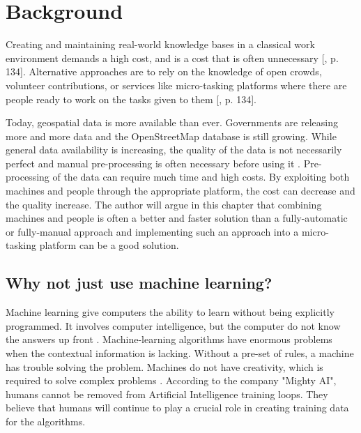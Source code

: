 \chapter{Background}\label{chp:background}

Creating and maintaining real-world knowledge bases in a classical work environment demands a high cost, and is a cost that is often unnecessary [\citep{Meier2013}, p. 134]. Alternative approaches are to rely on the knowledge of open crowds, volunteer contributions, or services like micro-tasking platforms where there are people ready to work on the tasks given to them [\citep{Meier2013}, p. 134].   

Today, geospatial data is more available than ever. Governments are releasing more and more data and the OpenStreetMap database is still growing. While general data availability is increasing, the quality of the data is not necessarily perfect and manual pre-processing is often necessary before using it \citep{Difallah2015}.  Pre-processing of the data can require much time and high costs. By exploiting both machines and people through the appropriate platform, the cost can decrease and the quality increase. The author will argue in this chapter that combining machines and people is often a better and faster solution than a fully-automatic or fully-manual approach and implementing such an approach into a micro-tasking platform can be a good solution. 

\section{Why not just use machine learning?}

Machine learning give computers the ability to learn without being explicitly programmed. It involves computer intelligence, but the computer do not know the answers up front \citep{StanfordUniversity2017}. Machine-learning algorithms have enormous problems when the contextual information is lacking. Without a pre-set of rules, a machine has trouble solving the problem. Machines do not have creativity, which is required to solve complex problems \citep{Holzinger2016a}. According to the company "Mighty AI", humans cannot be removed from Artificial Intelligence training loops. They believe that humans will continue to play a crucial role in creating training data for the algorithms. %

